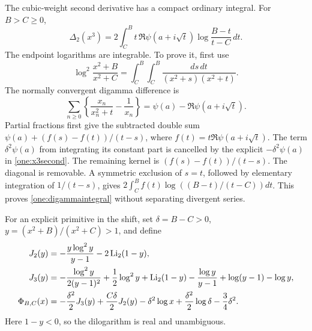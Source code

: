 The cubic-weight second derivative has a compact ordinary integral.
For $B>C\ge0$,
\begin{equation}\label{one:digammaintegral}
 \boxed{\displaystyle
 \Delta_2(x^3)=2\int_C^B
       t\,\Re\psi(a+i\sqrt t)
                       \log\frac{B-t}{t-C}\,dt.}
\end{equation}
The endpoint logarithms are integrable.  To prove it, first use
\[
 \log^2\frac{x^2+B}{x^2+C}
       =\int_C^B\!\int_C^B\frac{ds\,dt}{(x^2+s)(x^2+t)}.
\]
The normally convergent digamma difference is
\[
 \sum_{n\ge0}\left\{\frac{x_n}{x_n^2+t}-\frac1{x_n}\right\}
        =\psi(a)-\Re\psi(a+i\sqrt t).
\]
Partial fractions first give the subtracted double sum
$\psi(a)+(f(s)-f(t))/(t-s)$, where
$f(t)=t\Re\psi(a+i\sqrt t)$.  The term $\delta^2\psi(a)$
from integrating its constant part is cancelled by the explicit
$-\delta^2\psi(a)$ in \eqref{one:x3second}.  The remaining kernel is
$(f(s)-f(t))/(t-s)$.
The diagonal is removable.  A symmetric exclusion of $s=t$, followed
by elementary integration of $1/(t-s)$, gives
$2\int_C^B f(t)\log((B-t)/(t-C))dt$.  This proves
\eqref{one:digammaintegral} without separating divergent series.

For an explicit primitive in the shift, set $\delta=B-C>0$,
$y=(x^2+B)/(x^2+C)>1$, and define
\begin{align}
 J_2(y)&=-\frac{y\log^2y}{y-1}-2\operatorname{Li}_2(1-y),\label{one:J2}\\
 J_3(y)&=-\frac{\log^2y}{2(y-1)^2}+\frac12\log^2y
       +\operatorname{Li}_2(1-y)-\frac{\log y}{y-1}
       +\log(y-1)-\log y,\label{one:J3}\\
 \Phi_{B,C}(x)&=-\frac{\delta^2}{2}J_3(y)
       +\frac{C\delta}{2}J_2(y)-\delta^2\log x
       +\frac{\delta^2}{2}\log\delta-\frac34\delta^2.
       \label{one:Phi}
\end{align}
Here $1-y<0$, so the dilogarithm is real and unambiguous.

